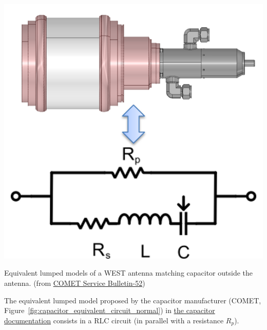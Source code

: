 \begin{marginfigure}[-5cm]
	\centering
	\includegraphics[width=1.0\linewidth]{figures/chap3/WEST_ICRH/capacitor_equivalent_circuit_normal}
	\caption{Equivalent lumped models of a WEST antenna matching capacitor outside the antenna. (from 	\href{https://www.comet-pct.com/getmedia/fb744f1b-1125-4c91-8af3-e058fa56a3bd/SB-52_Technical_Recommendations_and_General_Instructions_for_Vacuum_Capacitors.aspx}{COMET Service Bulletin-52})}
	\label{fig:capacitor_equivalent_circuit_normal}	  
\end{marginfigure}

The equivalent lumped model proposed by the capacitor manufacturer (COMET, Figure~\ref{fig:capacitor_equivalent_circuit_normal}) in \href{https://www.comet-pct.com/getmedia/fb744f1b-1125-4c91-8af3-e058fa56a3bd/SB-52_Technical_Recommendations_and_General_Instructions_for_Vacuum_Capacitors.aspx}{the capacitor documentation} consists in a RLC circuit (in parallel with a resistance $R_p$). 


